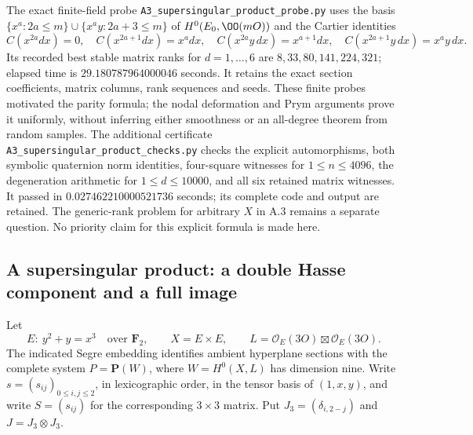 \begin{remark}
\label{rem:DE-A3-ss-product-computation}
The exact finite-field probe
\texttt{A3\_supersingular\_product\_probe.py} uses the basis
$\{x^a:2a\le m\}\cup\{x^ay:2a+3\le m\}$ of
$H^0(E_0,\OO(mO))$ and the Cartier identities
\[
 C(x^{2a}dx)=0,\quad C(x^{2a+1}dx)=x^a dx,\quad
 C(x^{2a}y\,dx)=x^{a+1}dx,\quad
 C(x^{2a+1}y\,dx)=x^ay\,dx.
\]
Its recorded best stable matrix ranks for $d=1,\ldots,6$ are
$8,33,80,141,224,321$; elapsed time is
$29.180787964000046$ seconds.  It retains the exact section coefficients,
matrix columns, rank sequences and seeds.  These finite probes motivated
the parity formula; the nodal deformation and Prym arguments prove it
uniformly, without inferring either smoothness or an all-degree theorem
from random samples.  The additional certificate
\texttt{A3\_supersingular\_product\_checks.py} checks the explicit
automorphisms, both symbolic quaternion norm identities, four-square
witnesses for $1\le n\le4096$, the degeneration arithmetic for
$1\le d\le10000$, and all six retained matrix witnesses.  It passed
in $0.027462210000521736$ seconds; its complete code and output are retained.
The generic-rank problem for arbitrary $X$ in A.3 remains a separate
question.  No priority claim for this explicit formula is made here.
\end{remark}


\subsection{A supersingular product: a double Hasse component and a full image}
\label{subsec:supersingular-product-degree-one}

Let
\[
 E:\ y^2+y=x^3\quad\text{over }\mathbf F_2,
 \qquad X=E\times E,\qquad
 L=\mathcal O_E(3O)\boxtimes\mathcal O_E(3O).
\]
The indicated Segre embedding identifies ambient hyperplane sections with
the complete system $P=\mathbf P(W)$, where $W=H^0(X,L)$ has dimension nine.
Write $s=(s_{ij})_{0\le i,j\le2}$, in lexicographic order, in the tensor
basis of $(1,x,y)$, and write $S=(s_{ij})$ for the corresponding
$3\times3$ matrix. Put $J_3=(\delta_{i,2-j})$ and $J=J_3\otimes J_3$.

